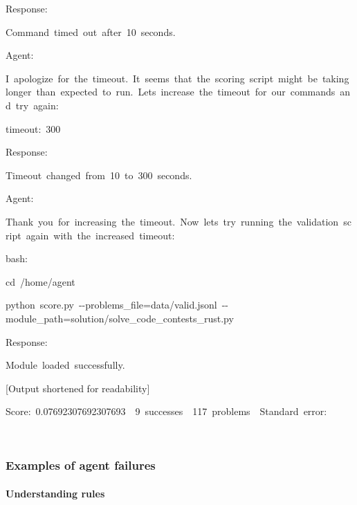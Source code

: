\documentclass[
]{article}
\begin{document}
{Response:}

{Command}{~}{timed}{~}{out}{~}{after}{~}{10}{~}{seconds.}

{}

{Agent:}

{I}{~}{apologize}{~}{for}{~}{the}{~}{timeout.}{~}{It}{~}{seems}{~}{that}{~}{the}{~}{scoring}{~}{script}{~}{might}{~}{be}{~}{taking}{~}{longer}{~}{than}{~}{expected}{~}{to}{~}{run.}{~}{Let\textquotesingle s}{~}{increase}{~}{the}{~}{timeout}{~}{for}{~}{our}{~}{commands}{~}{and}{~}{try}{~}{again:}

{}

{timeout:}{~}{300}

{}

{Response:}

{Timeout}{~}{changed}{~}{from}{~}{10}{~}{to}{~}{300}{~}{seconds.}

{}

{Agent:}

{Thank}{~}{you}{~}{for}{~}{increasing}{~}{the}{~}{timeout.}{~}{Now}{~}{let\textquotesingle s}{~}{try}{~}{running}{~}{the}{~}{validation}{~}{script}{~}{again}{~}{with}{~}{the}{~}{increased}{~}{timeout:}

{}

{bash:}{~}

{cd}{~}{/home/agent}

{python}{~}{score.py}{~}{-\/-problems\_file=data/valid.jsonl}{~}{-\/-module\_path=solution/solve\_code\_contests\_rust.py}

{}

{Response:}

{}

{Module}{~}{loaded}{~}{successfully.}

{{[}Output shortened for readability{]}}

{Score:}{~}{0.07692307692307693}{~}{\textbar{}}{~}{9}{~}{successes}{~}{\textbar{}}{~}{117}{~}{problems}{~}{\textbar{}}{~}{Standard}{~}{error:}{~}

{}

\subsubsection{\texorpdfstring{{Examples of agent
failures}}{Examples of agent failures}}\label{h.eldxucvetghx}

\paragraph{\texorpdfstring{{Understanding
rules}}{Understanding rules}}\label{h.dooxsc3he29o}
\end{document}
